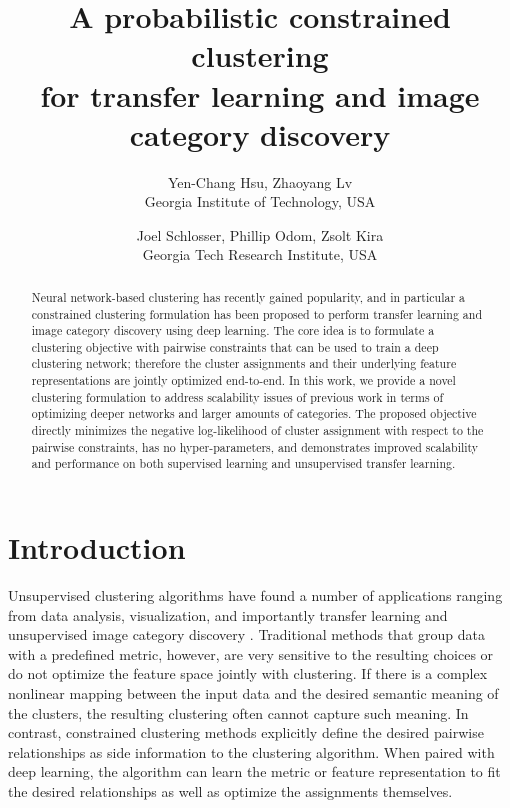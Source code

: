 \documentclass[10pt,twocolumn,letterpaper]{article}
\begin{document}
\title{A probabilistic constrained clustering\\for transfer learning and image category discovery}

\author{Yen-Chang Hsu, Zhaoyang Lv\\
Georgia Institute of Technology, USA\\
\and
Joel Schlosser, Phillip Odom, Zsolt Kira\\
Georgia Tech Research Institute, USA\\
}

\maketitle


\begin{abstract}
Neural network-based clustering has recently gained popularity, and in particular a constrained clustering formulation has been proposed to perform transfer learning and image category discovery using deep learning. The core idea is to formulate a clustering objective with pairwise constraints that can be used to train a deep clustering network; therefore the cluster assignments and their underlying feature representations are jointly optimized end-to-end. In this work, we provide a novel clustering formulation to address scalability issues of previous work in terms of optimizing deeper networks and larger amounts of categories. The proposed objective directly minimizes the negative log-likelihood of cluster assignment with respect to the pairwise constraints, has no hyper-parameters, and demonstrates improved scalability and performance on both supervised learning and unsupervised transfer learning. 
\end{abstract}

\section{Introduction}
Unsupervised clustering algorithms have found a number of applications ranging from data analysis, visualization, and importantly transfer learning and unsupervised image category discovery \cite{shu2018unseen,ovsep2017large,hsu2016deep}. Traditional methods that group data with a predefined metric, however, are very sensitive to the resulting choices or do not optimize the feature space jointly with clustering. If there is a complex nonlinear mapping between the input data and the desired semantic meaning of the clusters, the resulting clustering often cannot capture such meaning. In contrast, constrained clustering methods explicitly define the desired pairwise relationships as side information to the clustering algorithm. When paired with deep learning, the algorithm can learn the metric or feature representation to fit the desired relationships as well as optimize the assignments themselves.
\end{document}
